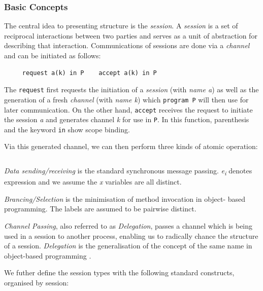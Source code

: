 \documentclass[11pt]{scrartcl}
\begin{document}
\subsubsection{Basic Concepts}

The central idea to presenting structure is the \emph{session}. A \emph{session} 
is a set of reciprocal interactions between two parties and serves as a unit of 
abstraction for describing that interaction. Communications of sessions are done 
via a \emph{channel} and can be initiated as follows:

\begin{verbatim}
	 request a(k) in P    accept a(k) in P 
\end{verbatim}

The \texttt{request} first requests the initiation of a \emph{session} (with 
\emph{name a}) as well as the generation of a fresh \emph{channel} (with 
\emph{name k}) which \texttt{program P} will then use for later communication. 
On the other hand, \texttt{accept} receives the request to initiate the session 
\emph{a} and generates channel \emph{k} for use in \texttt{P}. In this function, 
parenthesis and the keyword \texttt{in} show scope binding.

Via this generated channel, we can then perform three kinds of atomic operation:

\begin{verbatim}

\end{verbatim}

\emph{Data sending/receiving} is the standard synchronous message passing. 
\emph{e\textsubscript{i}} denotes expression and we assume the \emph{x} 
variables are all distinct.

\emph{Brancing/Selection} is the minimisation of method invocation in object-
based programming. The labels are assumed to be pairwise distinct. 

\emph{Channel Passing}, also referred to as \emph{Delegation}, passes a channel 
which is being used in a session to another process, enabling us to radically 
chance the structure of a session. \emph{Delegation} is the generalisation of 
the concept of the same name in object-based programming \cite{YT87}.

We futher define the session types with the following standard constructs, 
organised by session:

\begin{verbatim}

\end{verbatim}
\end{document}
